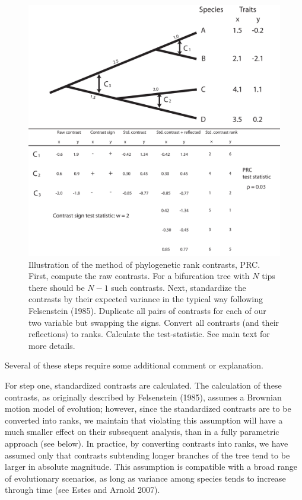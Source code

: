 \documentclass[fleqn,10pt,lineno]{wlpeerj} %
\begin{document}
\begin{figure}
\includegraphics[width=1\linewidth]{schematic} \caption{Illustration of the method of phylogenetic rank contrasts, PRC. First, compute the raw contrasts. For a bifurcation tree with $N$ tips there should be $N-1$ such contrasts. Next, standardize the contrasts by their expected variance in the typical way following Felsenstein (1985). Duplicate all pairs of contrasts for each of our two variable but swapping the signs. Convert all contrasts (and their reflections) to ranks. Calculate the test-statistic. See main text for more details.}\label{fig:Harmon-fig1}
\end{figure}

Several of these steps require some additional comment or explanation.

For step one, standardized contrasts are calculated. The calculation of these contrasts, as originally described by Felsenstein (1985), assumes a Brownian motion model of evolution; however, since the standardized contrasts are to be converted into ranks, we maintain that violating this assumption will have a much smaller effect on their subsequent analysis, than in a fully parametric approach (see below). In practice, by converting contrasts into ranks, we have assumed only that contrasts subtending longer branches of the tree tend to be larger in absolute magnitude. This assumption is compatible with a broad range of evolutionary scenarios, as long as variance among species tends to increase through time (see Estes and Arnold 2007).
\end{document}
